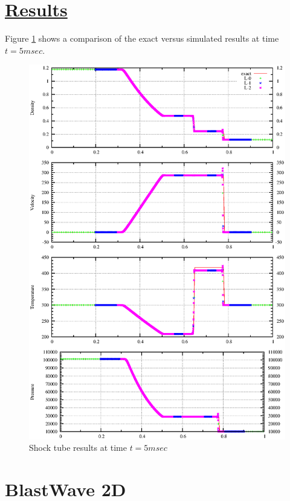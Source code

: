 \documentclass[fleqn]{article}
\begin{document}
\section*{\underline{Results}}
Figure \ref{results.ST.AMR} shows a comparison of the exact versus simulated results at time $t = 5msec$.
\begin{figure}
\includegraphics[scale=.85]{figures/shockTube_AMR.ps}
\caption{Shock tube results at time $t = 5msec$}
\label{results.ST.AMR}
\end{figure}
\newpage


\section*{\center BlastWave 2D}
\end{document}
